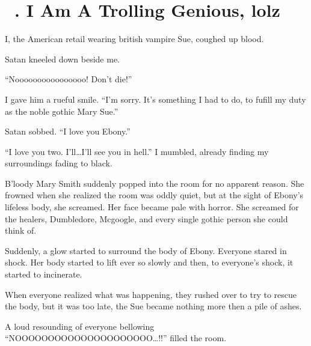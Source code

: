 \section{\chaptername~\thesection. I Am A Trolling Genious, lolz}



I, the American retail wearing british vampire Sue, coughed up blood.

Satan kneeled down beside me.

\enquote{Noooooooooooooooo! Don't die!}

I gave him a rueful smile. \enquote{I'm sorry. It's something I had to do, to fufill my duty as the noble gothic Mary Sue.}

Satan sobbed. \enquote{I love you Ebony.}

\enquote{I love you two. I'll\ldots I'll see you in hell.} I mumbled, already finding my surroundings fading to black.

B'loody Mary Smith suddenly popped into the room for no apparent reason. She frowned when she realized the room was oddly quiet, but at the sight of Ebony's lifeless body, she screamed. Her face became pale with horror. She screamed for the healers, Dumbledore, Mcgoogle, and every single gothic person she could think of.

Suddenly, a glow started to surround the body of Ebony. Everyone stared in shock. Her body started to lift ever so slowly and then, to everyone's shock, it started to incinerate.

When everyone realized what was happening, they rushed over to try to rescue the body, but it was too late, the Sue became nothing more then a pile of ashes.

A loud resounding of everyone bellowing \enquote{NOOO\-O\-O\-O\-O\-O\-O\-O\-O\-O\-O\-O\-O\-O\-OOOOO\ldots!!} filled the room.


